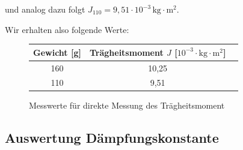 \documentclass[fontsize=12pt]{scrartcl}
\begin{document}
und analog dazu folgt $J_{110} = 9,51\cdot 10^{-3}\,{{\text{kg} \cdot {\text{m}^2}}}$. 

Wir erhalten also folgende Werte: 
\begin{figure}[H]
\centering
\caption{Messwerte für direkte Messung des Trägheitsmoment}
\begin{tabular}{|c|c|c|} \hline
Gewicht [g] & Trägheitsmoment $J$ [$10^{-3}\cdot {{\text{kg} \cdot {\text{m}^2}}}$]  \\ \hline
160 & 10,25 \\ \hline
110 & 9,51\\ \hline
\end{tabular}				 
\end{figure}

\newpage

\subsection{Auswertung Dämpfungskonstante}
\end{document}
